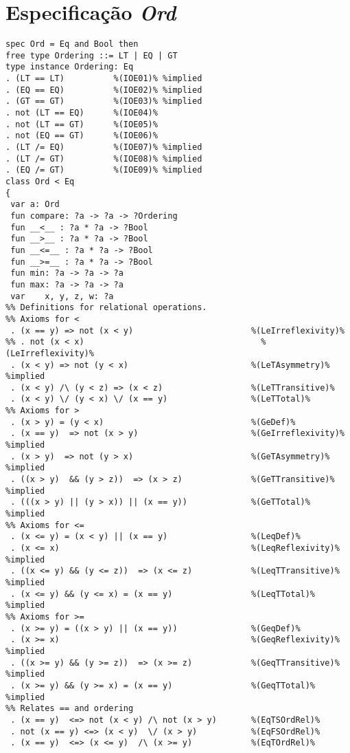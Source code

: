 \section{Especificação \textit{Ord}}
\label{appendix:lazySpec:ord}
\begin{Verbatim}
spec Ord = Eq and Bool then
free type Ordering ::= LT | EQ | GT
type instance Ordering: Eq
. (LT == LT)          %(IOE01)% %implied
. (EQ == EQ)          %(IOE02)% %implied
. (GT == GT)          %(IOE03)% %implied
. not (LT == EQ)      %(IOE04)%
. not (LT == GT)      %(IOE05)%
. not (EQ == GT)      %(IOE06)%
. (LT /= EQ)          %(IOE07)% %implied
. (LT /= GT)          %(IOE08)% %implied
. (EQ /= GT)          %(IOE09)% %implied
class Ord < Eq
{
 var a: Ord
 fun compare: ?a -> ?a -> ?Ordering
 fun __<__ : ?a * ?a -> ?Bool
 fun __>__ : ?a * ?a -> ?Bool
 fun __<=__ : ?a * ?a -> ?Bool
 fun __>=__ : ?a * ?a -> ?Bool
 fun min: ?a -> ?a -> ?a
 fun max: ?a -> ?a -> ?a
 var    x, y, z, w: ?a
%% Definitions for relational operations.
%% Axioms for <
 . (x == y) => not (x < y)                        %(LeIrreflexivity)%
%% . not (x < x)                                    %(LeIrreflexivity)%
 . (x < y) => not (y < x)                         %(LeTAsymmetry)% %implied
 . (x < y) /\ (y < z) => (x < z)                  %(LeTTransitive)%
 . (x < y) \/ (y < x) \/ (x == y)                 %(LeTTotal)%
%% Axioms for >
 . (x > y) = (y < x)                              %(GeDef)%
 . (x == y)  => not (x > y)                       %(GeIrreflexivity)% %implied
 . (x > y)  => not (y > x)                        %(GeTAsymmetry)% %implied
 . ((x > y)  && (y > z))  => (x > z)              %(GeTTransitive)% %implied
 . (((x > y) || (y > x)) || (x == y))             %(GeTTotal)% %implied 
%% Axioms for <=
 . (x <= y) = (x < y) || (x == y)                 %(LeqDef)%
 . (x <= x)                                       %(LeqReflexivity)% %implied
 . ((x <= y) && (y <= z))  => (x <= z)            %(LeqTTransitive)% %implied
 . (x <= y) && (y <= x) = (x == y)                %(LeqTTotal)% %implied
%% Axioms for >=
 . (x >= y) = ((x > y) || (x == y))               %(GeqDef)%
 . (x >= x)                                       %(GeqReflexivity)% %implied 
 . ((x >= y) && (y >= z))  => (x >= z)            %(GeqTTransitive)% %implied
 . (x >= y) && (y >= x) = (x == y)                %(GeqTTotal)% %implied
%% Relates == and ordering
 . (x == y)  <=> not (x < y) /\ not (x > y)       %(EqTSOrdRel)%
 . not (x == y) <=> (x < y)  \/ (x > y)           %(EqFSOrdRel)%
 . (x == y)  <=> (x <= y)  /\ (x >= y)            %(EqTOrdRel)%

\end{Verbatim}
